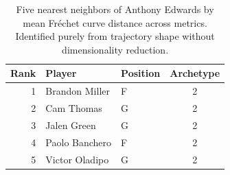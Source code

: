 \begin{table}[htbp]
  \centering\small
  \begin{tabular}{rllc}
    \toprule
    Rank & Player & Position & Archetype \\
    \midrule
    1 & Brandon Miller & F & 2 \\
    2 & Cam Thomas & G & 2 \\
    3 & Jalen Green & G & 2 \\
    4 & Paolo Banchero & F & 2 \\
    5 & Victor Oladipo & G & 2 \\
    \bottomrule
  \end{tabular}
  \caption{Five nearest neighbors of Anthony Edwards by mean Fr\'{e}chet curve distance across metrics. Identified purely from trajectory shape without dimensionality reduction.}
  \label{tab:Anthony_Edwards_frechet_curve_neighbors}
\end{table}


